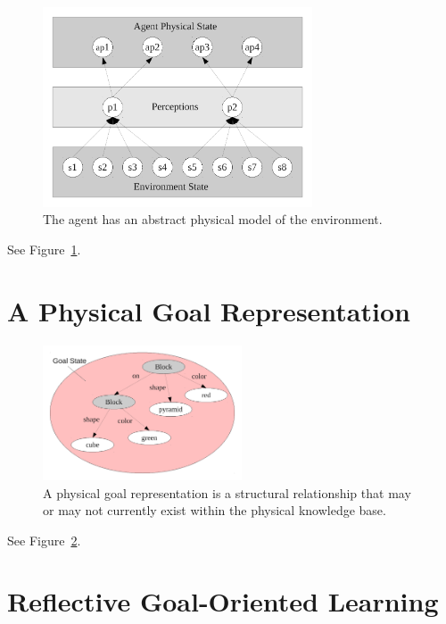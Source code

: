\begin{figure}[bth]
  \center
  \includegraphics[width=8cm]{gfx/environment_perception_physical}
  \caption[The agent has an abstract physical model of the
    environment]{The agent has an abstract physical model of the
    environment.}
  \label{fig:environment_perception_physical}
\end{figure}

See Figure~\ref{fig:environment_perception_physical}.


\section{A Physical Goal Representation}

\begin{figure}[bth]
  \center
  \includegraphics[height=4cm]{gfx/goal_state}
  \caption[A physical goal representation]{A physical goal
    representation is a structural relationship that may or may not
    currently exist within the physical knowledge base.}
  \label{fig:goal_state}
\end{figure}

See Figure~\ref{fig:goal_state}.


\section{Reflective Goal-Oriented Learning}

